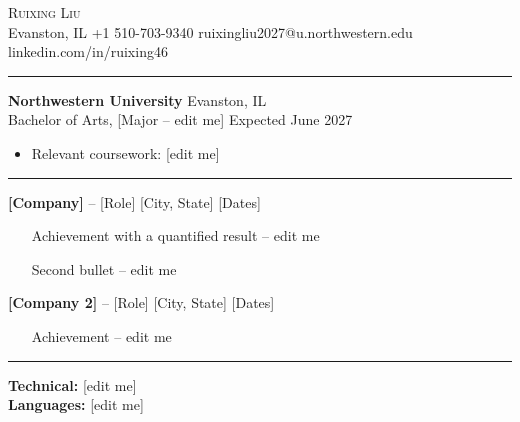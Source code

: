 \documentclass[11pt,letterpaper]{article}
\newcommand{\resheading}[1]{\vspace{6pt}{\large\scshape #1}\vspace{2pt}\hrule\vspace{6pt}}
\begin{document}
\begin{center}
  {\Huge \scshape Ruixing Liu}\\[4pt]
  Evanston, IL \textbar{} +1 510-703-9340 \textbar{} ruixingliu2027@u.northwestern.edu \textbar{} linkedin.com/in/ruixing46
\end{center}

\resheading{Education}
\textbf{Northwestern University} \hfill Evanston, IL\\
Bachelor of Arts, [Major -- edit me] \hfill Expected June 2027
\begin{itemize}
  \item Relevant coursework: [edit me]
\end{itemize}

\resheading{Experience}
\textbf{[Company]} -- [Role] \hfill [City, State] \textbar{} [Dates]
\begin{itemize}
  \item [Achievement with a quantified result -- edit me]
  \item [Second bullet -- edit me]
\end{itemize}

\textbf{[Company 2]} -- [Role] \hfill [City, State] \textbar{} [Dates]
\begin{itemize}
  \item [Achievement -- edit me]
\end{itemize}

\resheading{Skills}
\textbf{Technical:} [edit me] \\
\textbf{Languages:} [edit me]
\end{document}
